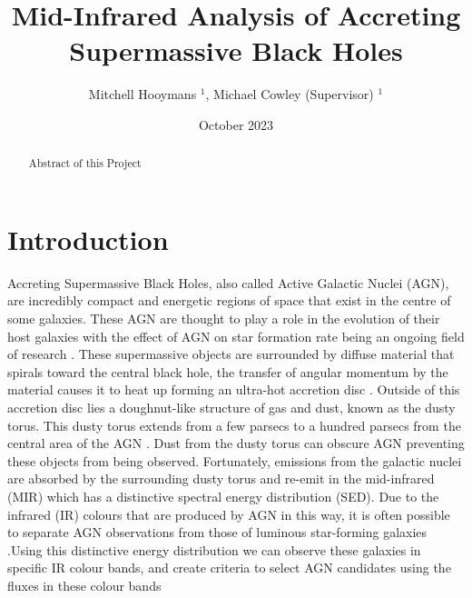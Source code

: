 \documentclass[11pt]{iopart}
\date{October 2023}
\begin{document}
\title{Mid-Infrared Analysis of Accreting Supermassive Black Holes}
\author{Mitchell Hooymans $^1$, Michael Cowley (Supervisor) $^1$}
\address{$^1$ Queensland University of Technology, Brisbane, Australia, 4000}

\begin{abstract}
    Abstract of this Project
\end{abstract}

\ioptwocol
\section{Introduction}
Accreting Supermassive Black Holes, also called Active Galactic Nuclei (AGN), are incredibly compact and energetic regions of space that exist in the centre of some galaxies. These AGN are thought to play a role in the evolution of their host galaxies with the effect of AGN on star formation rate being an ongoing field of research \cite{cowley_zfourge_2016}. These supermassive objects are surrounded by diffuse material that spirals toward the central black hole, the transfer of angular momentum by the material causes it to heat up forming an ultra-hot accretion disc \cite{shakura_black_1973}. Outside of this accretion disc lies a doughnut-like structure of gas and dust, known as the dusty torus. This dusty torus extends from a few parsecs to a hundred parsecs from the central area of the AGN \cite{netzer_revisiting_2015}. Dust from the dusty torus can obscure AGN preventing these objects from being observed. Fortunately, emissions from the galactic nuclei are absorbed by the surrounding dusty torus and re-emit in the mid-infrared (MIR) which has a distinctive spectral energy distribution (SED)\cite{lyu_polar_2018}. Due to the infrared (IR) colours that are produced by AGN in this way, it is often possible to separate AGN observations from those of luminous star-forming galaxies \cite{hickox_obscured_2018}.Using this distinctive energy distribution we can observe these galaxies in specific IR colour bands, and create criteria to select AGN candidates using the fluxes in these colour bands \cite{lacy_obscured_2004, stern_midinfrared_2005, donley_identifying_2012, messias_new_2012}
\end{document}
